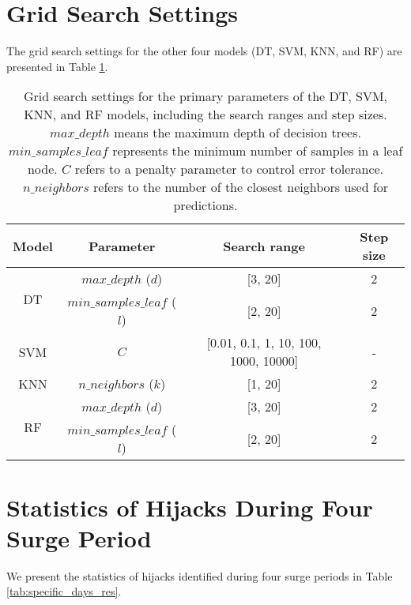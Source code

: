 \section{Grid Search Settings} 
\label{app:grid_search_settings}
The grid search settings for the other four models (DT, SVM, KNN, and RF) are presented in Table \ref{tab:identi_parameters}.

  \begin{table}[t!]
    \centering
    \fontsize{6}{6}\selectfont
    \renewcommand{\arraystretch}{1.2}
    
    \begin{tabular}{cccc}
        \toprule
        \textbf{Model} & \textbf{Parameter} & \textbf{Search range} & \textbf{Step size} \\
        \midrule
        \multirow{2}{*}{DT} & $max\_depth$ ($d$) & [3, 20] & 2 \\
        & $min\_samples\_leaf$ ($l$) & [2, 20]  & 2 \\
        SVM & $C$ & [0.01, 0.1, 1, 10, 100, 1000, 10000] & - \\
        KNN & $n\_neighbors$ ($k$) & [1, 20] & 2\\
        \multirow{2}{*}{RF} & $max\_depth$ ($d$) & [3, 20] & 2 \\
        & $min\_samples\_leaf$ ($l$) & [2, 20]  & 2 \\
        \bottomrule
    \end{tabular}
    \caption{\small Grid search settings for the primary parameters of the DT, SVM, KNN, and RF models, including the search ranges and step sizes. $max\_depth$ means the maximum depth of decision trees. $min\_samples\_leaf$ represents the minimum number of samples in a leaf node. $C$ refers to a penalty parameter to control error tolerance. $n\_neighbors$ refers to the number of the closest neighbors used for predictions.}
    \label{tab:identi_parameters}
\end{table}

\section{Statistics of Hijacks During Four Surge Period} \label{app:statistics}
 We present the statistics of hijacks identified during four surge periods in Table \ref{tab:specific_days_res}.



